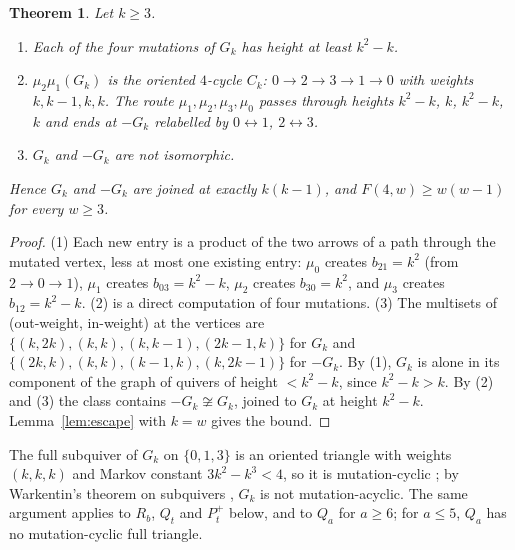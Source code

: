 \documentclass[11pt]{amsart}
\newtheorem{theorem}{Theorem}[section]
\theoremstyle{definition}
\theoremstyle{remark}
\begin{document}
\begin{theorem}\label{thm:gk}
Let $k\ge3$.
\begin{enumerate}
\item Each of the four mutations of $G_k$ has height at least $k^2-k$.
\item $\mu_2\mu_1(G_k)$ is the oriented $4$-cycle $C_k$: $0\to2\to3\to1\to0$ with weights $k,k-1,k,k$. The route $\mu_1,\mu_2,\mu_3,\mu_0$ passes through heights $k^2-k$, $k$, $k^2-k$, $k$ and ends at $-G_k$ relabelled by $0\leftrightarrow1$, $2\leftrightarrow3$.
\item $G_k$ and $-G_k$ are not isomorphic.
\end{enumerate}
Hence $G_k$ and $-G_k$ are joined at exactly $k(k-1)$, and $F(4,w)\ge w(w-1)$ for every $w\ge3$.
\end{theorem}
\begin{proof}
(1) Each new entry is a product of the two arrows of a path through the mutated vertex, less at most one existing entry: $\mu_0$ creates $b_{21}=k^2$ (from $2\to0\to1$), $\mu_1$ creates $b_{03}=k^2-k$, $\mu_2$ creates $b_{30}=k^2$, and $\mu_3$ creates $b_{12}=k^2-k$.
(2) is a direct computation of four mutations.
(3) The multisets of (out-weight, in-weight) at the vertices are $\{(k,2k),(k,k),(k,k-1),(2k-1,k)\}$ for $G_k$ and $\{(2k,k),(k,k),(k-1,k),(k,2k-1)\}$ for $-G_k$.
By (1), $G_k$ is alone in its component of the graph of quivers of height $<k^2-k$, since $k^2-k>k$. By (2) and (3) the class contains $-G_k\not\cong G_k$, joined to $G_k$ at height $k^2-k$. Lemma~\ref{lem:escape} with $k=w$ gives the bound.
\end{proof}

The full subquiver of $G_k$ on $\{0,1,3\}$ is an oriented triangle with weights $(k,k,k)$ and Markov constant $3k^2-k^3<4$, so it is mutation-cyclic \cite{BBH}; by Warkentin's theorem on subquivers \cite{War-sub}, $G_k$ is not mutation-acyclic. The same argument applies to $R_b$, $Q_t$ and $P^+_t$ below, and to $Q_a$ for $a\ge6$; for $a\le5$, $Q_a$ has no mutation-cyclic full triangle.
\end{document}
